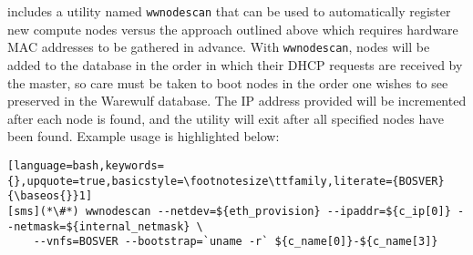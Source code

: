 \begin{center}
\begin{tcolorbox}[]
\small \Warewulf{} includes a utility named \texttt{wwnodescan} that can be
used to automatically register new compute nodes versus the approach outlined
above which requires hardware MAC addresses to be gathered in advance.  With
\texttt{wwnodescan}, nodes will be added to the \Warewulf{} database in the
order in which their DHCP requests are received by the master, so care must be
taken to boot nodes in the order one wishes to see preserved in the Warewulf
database. The IP address provided will be incremented after each node is found,
and the utility will exit after all specified nodes have been found. Example
usage is highlighted below:
\begin{lstlisting}[language=bash,keywords={},upquote=true,basicstyle=\footnotesize\ttfamily,literate={BOSVER}{\baseos{}}1]
[sms](*\#*) wwnodescan --netdev=${eth_provision} --ipaddr=${c_ip[0]} --netmask=${internal_netmask} \
    --vnfs=BOSVER --bootstrap=`uname -r` ${c_name[0]}-${c_name[3]}
\end{lstlisting}
\end{tcolorbox}
\end{center}
